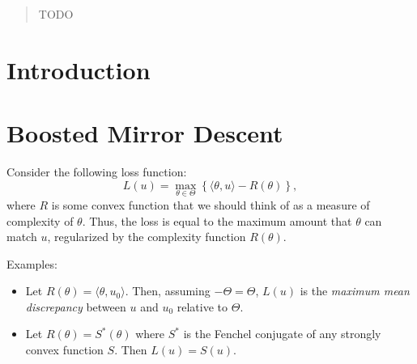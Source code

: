 \documentclass{article}
\begin{document}
 


\begin{abstract} 
TODO
\end{abstract} 

\section{Introduction}
\label{sec:intro}

\section{Boosted Mirror Descent}
\label{sec:algorithm}


Consider the following loss function:
\[ L(u) = \max_{\theta \in \Theta} \left\{\langle \theta, u \rangle - R(\theta) \right\}, \]
where $R$ is some convex function that we should think of as a measure of complexity 
of $\theta$. Thus, the loss is equal to the maximum amount that $\theta$ can match 
$u$, regularized by the complexity function $R(\theta)$.

Examples:
\begin{itemize}
\item Let $R(\theta) = \langle \theta, u_0 \rangle$. Then, assuming $-\Theta = \Theta$, $L(u)$ is the 
      \emph{maximum mean discrepancy} between $u$ and $u_0$ 
      relative to $\Theta$.
\item Let $R(\theta) = S^*(\theta)$ where $S^*$ is the Fenchel conjugate of 
      any strongly convex function $S$. Then $L(u) = S(u)$.
\end{itemize}
\end{document}
